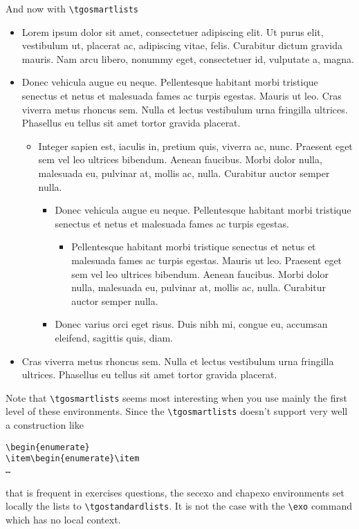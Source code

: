 \documentclass[english,ColorTheme=Red,FontSize=10pt]{tango}
\newcommand\TO[1]{\textsf{#1}}
\begin{document}
\bigskip

And now with \verb+\tgosmartlists+ \tgosmartlists
\begin{itemize}
\item Lorem ipsum dolor sit amet, consectetuer adipiscing elit. Ut purus elit, vestibulum ut, placerat ac, adipiscing vitae, felis. Curabitur dictum gravida mauris. Nam arcu libero, nonummy eget, consectetuer id, vulputate a, magna.
\item Donec vehicula augue eu neque. Pellentesque habitant morbi tristique senectus et netus et malesuada fames ac turpis egestas. Mauris ut leo. Cras viverra metus rhoncus sem. Nulla et lectus vestibulum urna fringilla ultrices. Phasellus eu tellus sit amet tortor gravida placerat.
\begin{itemize}
\item Integer sapien est, iaculis in, pretium quis, viverra ac, nunc. Praesent eget sem vel leo ultrices bibendum. Aenean faucibus. Morbi dolor nulla, malesuada eu, pulvinar at, mollis ac, nulla. Curabitur auctor semper nulla.
\begin{itemize}
\item Donec vehicula augue eu neque. Pellentesque habitant morbi tristique senectus et netus et malesuada fames ac turpis egestas.
\begin{itemize}
\item Pellentesque habitant morbi tristique senectus et netus et malesuada fames ac turpis egestas. Mauris ut leo. Praesent eget sem vel leo ultrices bibendum. Aenean faucibus. Morbi dolor nulla, malesuada eu, pulvinar at, mollis ac, nulla. Curabitur auctor semper nulla.
\end{itemize}
\item Donec varius orci eget risus. Duis nibh mi, congue eu, accumsan eleifend, sagittis quis, diam. 
\end{itemize}\end{itemize}
\item  Cras viverra metus rhoncus sem. Nulla et lectus vestibulum urna fringilla ultrices. Phasellus eu tellus sit amet tortor gravida placerat.
\end{itemize}

Note that \verb+\tgosmartlists+ seems most interesting when you use mainly the first level of these environments.
Since the \verb+\tgosmartlists+ doesn't support very well a construction like
\begin{tcolorbox}
\begin{verbatim}
\begin{enumerate}
\item\begin{enumerate}\item
…
\end{verbatim}
\end{tcolorbox}
that is frequent in exercises questions,
the \TO{secexo} and \TO{chapexo} environments set locally the lists to \verb+\tgostandardlists+. It is not the case with the \verb+\exo+ command which has no local context. \tgostandardlists
\end{document}
